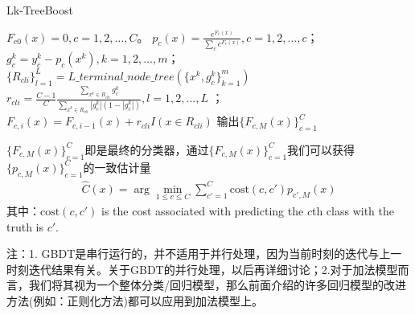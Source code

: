               \begin{algorithm}[H]
                  \caption{Lk-TreeBoost}\label{code:Lk-TreeBoost}
                  \begin{algorithmic}[1]
                      \State $F_{c0}(x) = 0,c = 1,2,\dots,C$。
                          \State $p_c(x) = \frac{e^{F_c(x)}}{\sum_c e^{F_c(x)}},c=1,2,\dots,c$；
                              \State $g_c^k = y_c^k - p_c(x^k),k=1,2,\dots,m$；
                              \State $\{R_{cli}\}_{l=1}^L = L\_terminal\_node\_tree(\{x^k,g_c^k\}_{k=1}^m)$
                              \State $r_{cli} = \frac{C-1}{C} \frac{\sum_{x^k\in R_{cli}}g_c^k}{\sum_{x^k\in R_{cli}}|g_{c}^k|(1-|g_c^k|)},l=1,2,\dots,L$ ；
                              \State $F_{c,i}(x) = F_{c,i-1}(x) + r_{cli}I(x\in R_{cli})$
                          \EndFor
                      \EndFor
                      \State 输出$\{F_{c,M}(x)\}_{c=1}^C$
                  \end{algorithmic}
              \end{algorithm}
              \par
              $\{F_{c,M}(x)\}_{c=1}^C$即是最终的分类器，通过$\{F_{c,M}(x)\}_{c=1}^C$我们可以获得$\{p_{c,M}(x)\}_{c=1}^C$的一致估计量
              \begin{align*}
              \hat{C}(x) = \arg\min_{1 \leqslant c \leqslant C}\sum_{c'=1}^C \mathrm{cost}(c,c')p_{c',M}(x)
              \end{align*}
              其中：$\mathrm{cost}(c,c')$ is the cost associated with predicting the $c$th class with the truth is $c'$.
              \par
              注：1. GBDT是串行运行的，并不适用于并行处理，因为当前时刻的迭代与上一时刻迭代结果有关。关于GBDT的并行处理，以后再详细讨论；2.对于加法模型而言，我们将其视为一个整体分类/回归模型，那么前面介绍的许多回归模型的改进方法(例如：正则化方法)都可以应用到加法模型上。

